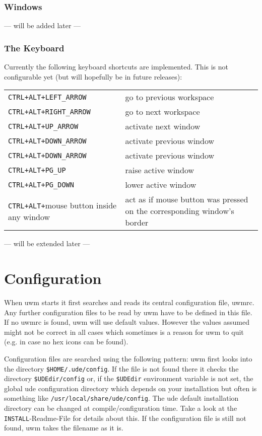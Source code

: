 \documentclass[10pt,a4paper]{article}
\newcommand{\uwm}{{\sc uwm} }
\newcommand{\ude}{{\sc ude} }
\begin{document}
\section{Windows}
\begin{center} --- will be added later --- \end{center}
\section{The Keyboard}
Currently the following keyboard shortcuts are implemented. This is not configurable yet (but will hopefully be in future releases):

\begin{tabular}{p{4cm}p{8cm}}
\texttt{CTRL+ALT+LEFT\_ARROW} & go to previous workspace\\
\texttt{CTRL+ALT+RIGHT\_ARROW} & go to next workspace\\
\texttt{CTRL+ALT+UP\_ARROW} & activate next window\\
\texttt{CTRL+ALT+DOWN\_ARROW} & activate previous window\\
\texttt{CTRL+ALT+DOWN\_ARROW} & activate previous window\\
\texttt{CTRL+ALT+PG\_UP} & raise active window\\
\texttt{CTRL+ALT+PG\_DOWN} & lower active window\\
\texttt{CTRL+ALT+}mouse button inside any window & act as if mouse button was pressed on the corresponding window's border
\end{tabular}

\begin{center} --- will be extended later --- \end{center}

\part{Configuration}\label{Configuration}
When \uwm starts it first searches and reads its central configuration file,
\textrm{uwmrc}. Any further configuration files to be read by \uwm have to be
defined in this file. If no \textsf{uwmrc} is found, \uwm will use
default values. However the values assumed might not be correct in all cases
which sometimes is a reason for uwm to quit (e.g. in case no hex icons can be
found).

Configuration files are searched using the following pattern: \uwm first looks
into the directory \texttt{\$HOME/.ude/config}. If the file is not found there
it checks the directory \texttt{\$UDEdir/config} or, if the \texttt{\$UDEdir}
environment variable is not set, the global \ude configuration directory which
depends on your installation but often is something like
\texttt{/usr/local/share/ude/config}. The \ude
default installation directory can be changed at compile/configuration time.
Take a look at the \texttt{INSTALL}-Readme-File for details about this. If the
configuration file is still not found, \uwm takes the filename as it is.
\end{document}
